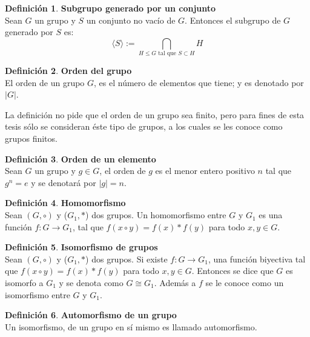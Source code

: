 \documentclass[12pt]{book}
\theoremstyle{definition}
\newtheorem{definition}{Definición}
\begin{document}
\begin{definition}\textbf{Subgrupo generado por un conjunto}\\
  Sean $G$ un grupo y $S$ un conjunto no vacío de $G$. Entonces el
  subgrupo de $G$ generado por $S$ es:
\begin{equation*}
\langle S \rangle := \bigcap_{\text{$H\le G$ tal que $S \subset H$}}H
\end{equation*}
\end{definition}

\begin{definition}\textbf{Orden del grupo}\\
  El orden de un grupo $G$, es el número de elementos que tiene; y es
  denotado por $|G|$.
\end{definition}

La definición no pide que el orden de un grupo sea finito, pero
para fines de esta tesis sólo se consideran éste tipo de grupos, a los
cuales se les conoce como grupos finitos.

\begin{definition}\textbf{Orden de un elemento}\\
  Sean $G$ un grupo y $g\in G$, el orden de $g$ es el menor entero
  positivo $n$ tal que $g^n=e$ y se denotará por $|g|=n$.
\end{definition}

\begin{definition}{\textbf{Homomorfismo}}\\ Sean $(G,\circ)$ y ($G_1, \ast$) dos grupos. 
Un homomorfismo entre $G$ y $G_1$ es una función $f : G \rightarrow G_1$, tal que $f(x\circ
  y)=f(x)\ast f(y)$ para todo $x,y\in G$.
\end{definition}

\begin{definition}\textbf{Isomorfismo de grupos}\\
  Sean $(G,\circ)$ y ($G_1, \ast$) dos grupos. Si existe $f : G
  \rightarrow G_1$, una función biyectiva tal que $f(x\circ
  y)=f(x)\ast f(y)$ para todo $x,y\in G$. Entonces se dice que $G$ es
  isomorfo a $G_1$ y se denota como $G\cong G_1$. Además a $f$ se le
  conoce como un isomorfismo entre $G$ y $G_1$.
\end{definition}


\begin{definition}\textbf{Automorfismo de un grupo}\\
  Un isomorfismo, de un grupo en sí mismo es llamado automorfismo.
\end{definition}
\end{document}
